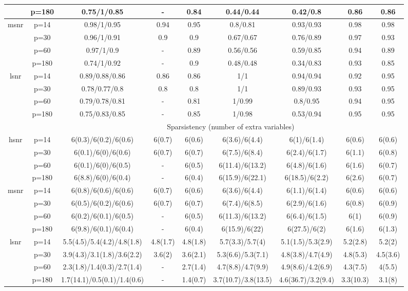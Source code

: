 \begin{table}[ht]
{\begin{tabular}{|c|c|ccccccc|}
   & p=180 & 0.75/1/0.85 & - & 0.84 & 0.44/0.44 & 0.42/0.8 & 0.86 & 0.86 \\ 
  \midrule\multirow{4}[2]{*}{msnr} & p=14 & 0.98/1/0.95 & 0.94 & 0.95 & 0.8/0.81 & 0.93/0.93 & 0.98 & 0.98 \\ 
   & p=30 & 0.96/1/0.91 & 0.9 & 0.9 & 0.67/0.67 & 0.76/0.89 & 0.97 & 0.93 \\ 
   & p=60 & 0.97/1/0.9 & - & 0.89 & 0.56/0.56 & 0.59/0.85 & 0.94 & 0.89 \\ 
   & p=180 & 0.74/1/0.92 & - & 0.9 & 0.48/0.48 & 0.34/0.83 & 0.93 & 0.85 \\ 
  \midrule\multirow{4}[2]{*}{lsnr} & p=14 & 0.89/0.88/0.86 & 0.86 & 0.86 & 1/1 & 0.94/0.94 & 0.92 & 0.95 \\ 
   & p=30 & 0.78/0.77/0.8 & 0.8 & 0.8 & 1/1 & 0.89/0.93 & 0.93 & 0.95 \\ 
   & p=60 & 0.79/0.78/0.81 & - & 0.81 & 1/0.99 & 0.8/0.95 & 0.94 & 0.95 \\ 
   & p=180 & 0.75/0.83/0.85 & - & 0.85 & 1/0.98 & 0.53/0.94 & 0.95 & 0.95 \\ 
   \midrule 
 \multicolumn{1}{|c}{} &       & \multicolumn{7}{c|}{Sparsistency (number of extra variables)} \\
\midrule\multirow{4}[2]{*}{hsnr} & p=14 & 6(0.3)/6(0.2)/6(0.6) & 6(0.7) & 6(0.6) & 6(3.6)/6(4.4) & 6(1)/6(1.4) & 6(0.6) & 6(0.6) \\ 
   & p=30 & 6(0.1)/6(0)/6(0.6) & 6(0.7) & 6(0.7) & 6(7.5)/6(8.4) & 6(2.4)/6(1.7) & 6(1.1) & 6(0.8) \\ 
   & p=60 & 6(0.1)/6(0)/6(0.5) & - & 6(0.5) & 6(11.4)/6(13.2) & 6(4.8)/6(1.6) & 6(1.6) & 6(0.7) \\ 
   & p=180 & 6(8.8)/6(0)/6(0.4) & - & 6(0.4) & 6(15.9)/6(22.1) & 6(18.5)/6(2.2) & 6(2.6) & 6(0.7) \\ 
  \midrule\multirow{4}[2]{*}{msnr} & p=14 & 6(0.8)/6(0.6)/6(0.6) & 6(0.7) & 6(0.6) & 6(3.6)/6(4.4) & 6(1.1)/6(1.4) & 6(0.6) & 6(0.6) \\ 
   & p=30 & 6(0.5)/6(0.2)/6(0.6) & 6(0.7) & 6(0.7) & 6(7.4)/6(8.5) & 6(2.9)/6(1.6) & 6(0.8) & 6(0.9) \\ 
   & p=60 & 6(0.2)/6(0.1)/6(0.5) & - & 6(0.5) & 6(11.3)/6(13.2) & 6(6.4)/6(1.5) & 6(1) & 6(0.9) \\ 
   & p=180 & 6(9.8)/6(0.1)/6(0.4) & - & 6(0.4) & 6(15.9)/6(22) & 6(27.5)/6(2) & 6(1.6) & 6(1.3) \\ 
  \midrule\multirow{4}[2]{*}{lsnr} & p=14 & 5.5(4.5)/5.4(4.2)/4.8(1.8) & 4.8(1.7) & 4.8(1.8) & 5.7(3.3)/5.7(4) & 5.1(1.5)/5.3(2.9) & 5.2(2.8) & 5.2(2) \\ 
   & p=30 & 3.9(4.3)/3.1(1.8)/3.6(2.2) & 3.6(2) & 3.6(2.1) & 5.3(6.6)/5.3(7.1) & 4.8(3.8)/4.7(4.9) & 4.8(5.3) & 4.5(3.6) \\ 
   & p=60 & 2.3(1.8)/1.4(0.3)/2.7(1.4) & - & 2.7(1.4) & 4.7(8.8)/4.7(9.9) & 4.9(8.6)/4.2(6.9) & 4.3(7.5) & 4(5.5) \\ 
   & p=180 & 1.7(14.1)/0.5(0.1)/1.4(0.6) & - & 1.4(0.7) & 3.7(10.7)/3.8(13.5) & 4.6(36.7)/3.2(9.4) & 3.3(10.3) & 3.1(8) \\ 
   \bottomrule 
\end{tabular}
}
\end{table}
